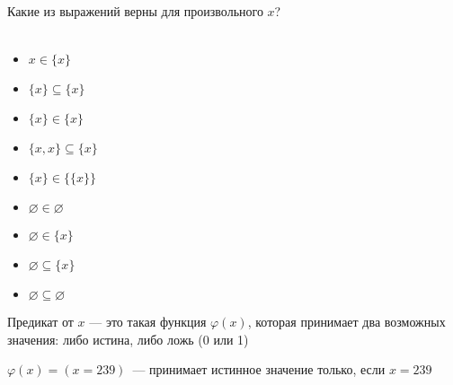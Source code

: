 \documentclass{article}
\begin{document}
    \begin{task_boxed}
        Какие из выражений верны для произвольного $x$?\\
        \\
        \begin{minipage}[c]{0.3\textwidth}
            \begin{itemize}
                \item $x \in \{x\}$
                \item $\{x\} \subseteq \{x\}$
                \item $\{x\} \in \{x\}$
            \end{itemize}
        \end{minipage}
        \begin{minipage}[c]{0.3\textwidth}
            \begin{itemize}
                \item $\{x,x\} \subseteq \{x\}$
                \item $\{x\} \in \{\{x\}\}$
                \item $\varnothing \in \varnothing$
            \end{itemize}
        \end{minipage}
        \begin{minipage}[c]{0.3\textwidth}
            \begin{itemize}
                \item $\varnothing \in \{x\}$
                \item $\varnothing \subseteq \{x\}$
                \item $\varnothing \subseteq \varnothing$
            \end{itemize}
        \end{minipage}
    \end{task_boxed}

    \begin{definition_boxed}
        Предикат от $x$ --- это такая функция $\varphi(x)$, которая принимает два возможных значения: либо истина, либо ложь (0 или 1)
    \end{definition_boxed}

    \begin{example}
        $\varphi(x) = (x = 239)$~--- принимает истинное значение только, если $x = 239$
    \end{example}
\end{document}
